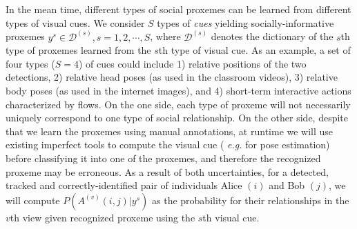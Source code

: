 


In the mean time, different types of social proxemes can be learned from different types of visual cues. We consider $S$ types of \emph{cues} yielding socially-informative proxemes $y^s\in\mathcal{D}^{(s)}, s=1,2,\cdots,S$, where $\mathcal{D}^{(s)}$ denotes the dictionary of the $s$th type of proxemes learned from the $s$th type of visual cue. As an example, a set of four types ($S=4$) of cues could include 1) relative positions of the two detections, 2) relative head poses (as used in the classroom videos), 3) relative body poses (as used in the internet images), and 4) short-term interactive actions characterized by flows. On the one side, each type of proxeme will not necessarily uniquely correspond to one type of social relationship. On the other side,  despite that we learn the proxemes using manual annotations, at runtime we will use existing imperfect tools to compute the visual cue ( \emph{e.g.} \cite{poselet,pose_part} for pose estimation) before classifying it into one of the proxemes, and therefore the recognized proxeme may be erroneous. As a result of both uncertainties, for a detected, tracked and correctly-identified pair of individuals Alice $(i)$ and Bob $(j)$, we will compute $P(A^{(v)}(i,j)|y^s)$ as the probability for their relationships in the $v$th view given recognized proxeme using the $s$th visual cue.

